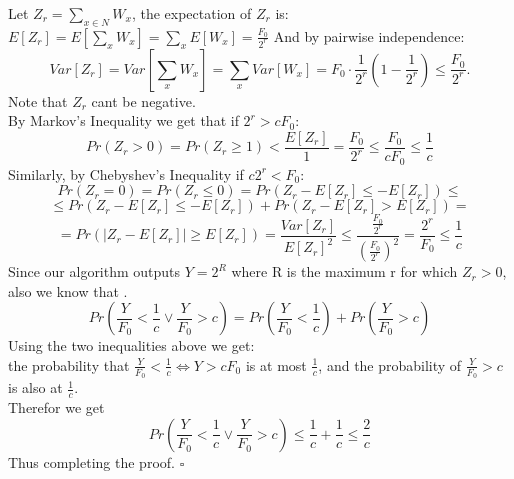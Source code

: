 \documentclass{article}
\begin{document}
Let \(Z_r = \sum_{x \in N}^{} W_x\), the expectation of $Z_r$ is: \(E[Z_r] = E[\sum_{x}^{} W_x] = \sum_{x}^{} E[W_x] = \frac{F_0}{2^r}\)
And by pairwise independence:
\[Var[Z_r] = Var[\sum_{x}^{} W_x] = \sum_{x}^{} Var[W_x] = F_0 \cdot \frac{1}{2^r}(1 - \frac{1}{2^r}) \leq \frac{F_0}{2^r}.\]
Note that $Z_r$ cant be negative.\\
By Markov’s Inequality we get that if \( 2^r > c F_0\):
\[
Pr(Z_r > 0) = Pr(Z_r \geq 1) < \frac{E[Z_r]}{1} = \frac{F_0}{2^r} \leq \frac{F_0}{c F_0} \leq \frac{1}{c}
\]
Similarly, by Chebyshev’s Inequality if \(c2^r < F_0\):
\[ Pr(Z_r = 0) = Pr(Z_r \leq 0) = Pr(Z_r - E[Z_r] \leq -E[Z_r]) \leq \]
\[ \leq Pr(Z_r - E[Z_r] \leq -E[Z_r]) + Pr(Z_r - E[Z_r] > E[Z_r]) = \]
\[ = Pr(|Z_r - E[Z_r]| \geq E[Z_r]) = \frac{Var[Z_r]}{E[Z_r]^2} \leq \frac{\frac{F_0}{2^r}}{(\frac{F_0}{2^r})^2} = \frac{2^r}{F_0} \leq \frac{1}{c}\]
Since our algorithm outputs $Y = 2^R$ where R is the maximum r for which $Z_r > 0$, also we know that .
\[Pr(\frac{Y}{F_0} < \frac{1}{c} \vee \frac{Y}{F_0} > c ) = Pr(\frac{Y}{F_0} < \frac{1}{c}) + Pr(\frac{Y}{F_0} > c)\]
Using the two inequalities above we get:\\
the probability that \(\frac{Y}{F_0} < \frac{1}{c} \Leftrightarrow Y > c F_0\) is at most \(\frac{1}{c}\), and the probability of \(\frac{Y}{F_0} > c\) is also at \(\frac{1}{c}\).\\
Therefor we get 
\[Pr(\frac{Y}{F_0} < \frac{1}{c} \vee \frac{Y}{F_0} > c ) \leq \frac{1}{c} + \frac{1}{c} \leq \frac{2}{c}\]
Thus completing the proof. $\square$
\end{document}
